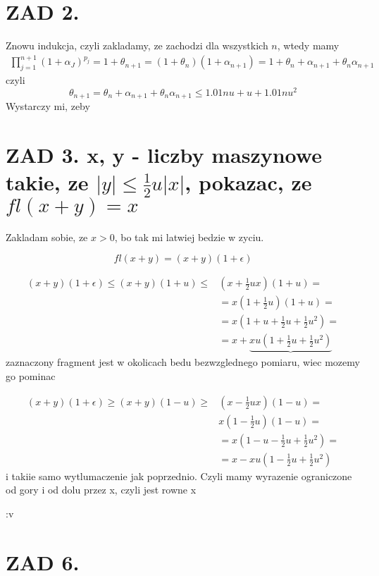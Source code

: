 \documentclass{article}[13pt]
\begin{document}
    \section{ZAD 2.}

    Znowu indukcja, czyli zakladamy, ze zachodzi dla wszystkich $n$, wtedy mamy
    \begin{align*}
        \prod\limits_{j=1}^{n+1}(1+\alpha_J)^{p_j}=1+\theta_{n+1}=(1+\theta_n)(1+\alpha_{n+1})=1+\theta_n+\alpha_{n+1}+\theta_n\alpha_{n+1}
    \end{align*}
    czyli
    $$\theta_{n+1}=\theta_n+\alpha_{n+1}+\theta_n\alpha_{n+1}\leq1.01nu+u+1.01nu^2$$
    Wystarczy mi, zeby



    \section*{ZAD 3. x, y - liczby maszynowe takie, ze $|y|\leq \frac12 u|x|$, pokazac, ze $fl(x+y)=x$}

    Zakladam sobie, ze $x>0$, bo tak mi latwiej bedzie w zyciu.

    $$fl(x+y)=(x+y)(1+\epsilon)$$

    \begin{align*}
        (x+y)(1+\epsilon)\leq (x+y)(1+u)\leq &(x+\frac12ux)(1+u)=\\
        &=x(1+\frac12u)(1+u)=\\
        &=x(1+u+\frac12u+\frac12 u^2)=\\
        &=x+\underbrace{xu(1+\frac12u+\frac12u^2)}
    \end{align*}
    zaznaczony fragment jest w okolicach bedu bezwzglednego pomiaru, wiec mozemy go pominac

    \begin{align*}
        (x+y)(1+\epsilon)\geq (x+y)(1-u)\geq &(x-\frac12ux)(1-u)=\\
        &x(1-\frac12u)(1-u)=\\
        &=x(1-u-\frac12u+\frac12u^2)=\\
        &=x-xu(1-\frac12u+\frac12u^2)
    \end{align*}
    i takiie samo wytlumaczenie jak poprzednio. Czyli mamy wyrazenie ograniczone od gory i od dolu przez x, czyli jest rowne x 
    
    :v

    \section*{ZAD 6.}
\end{document}
